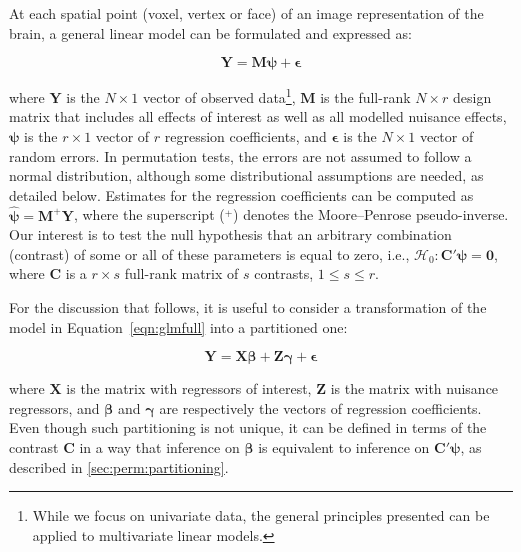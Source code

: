 At each spatial point (voxel, vertex or face) of an image representation of the brain, a general linear model \citep{Searle1971} can be formulated and expressed as:

\begin{equation}
\mathbf{Y} =  \mathbf{M} \boldsymbol{\psi} + \boldsymbol{\epsilon}
\label{eqn:glmfull}
\end{equation}

\noindent
where $\mathbf{Y}$ is the $N \times 1$ vector of observed data\footnote{While we focus on univariate data, the general principles presented can be applied to multivariate linear models.}, $\mathbf{M}$ is the full-rank $N \times r$ design matrix that includes all effects of interest as well as all modelled nuisance effects, $\boldsymbol{\psi}$ is the $r \times 1$ vector of $r$ regression coefficients, and $\boldsymbol{\epsilon}$ is the $N \times 1$ vector of random errors. In permutation tests, the errors are not assumed to follow a normal distribution, although some distributional assumptions are needed, as detailed below. Estimates for the regression coefficients can be computed as $\boldsymbol{\hat{\psi}} = \mathbf{M}^{+}\mathbf{Y}$, where the superscript ($^{+}$) denotes the Moore--Penrose pseudo-inverse. Our interest is to test the null hypothesis that an arbitrary combination (contrast) of some or all of these parameters is equal to zero, i.e., $\mathcal{H}_{0} : \mathbf{C}'\boldsymbol{\psi} =\boldsymbol{0}$, where $\mathbf{C}$ is a $r \times s$ full-rank matrix of $s$ contrasts, $1 \leqslant s \leqslant r$.

For the discussion that follows, it is useful to consider a transformation of the model in Equation~\ref{eqn:glmfull} into a partitioned one:

\begin{equation}
\mathbf{Y} = \mathbf{X}\boldsymbol{\beta} + \mathbf{Z}\boldsymbol{\gamma} + \boldsymbol{\epsilon}
\label{eqn:glmpart}
\end{equation}

\noindent
where $\mathbf{X}$ is the matrix with regressors of interest, $\mathbf{Z}$ is the matrix with nuisance regressors, and $\boldsymbol{\beta}$ and $\boldsymbol{\gamma}$ are respectively the vectors of regression coefficients. Even though such partitioning is not unique, it can be defined in terms of the contrast $\mathbf{C}$ in a way that inference on $\boldsymbol{\beta}$ is equivalent to inference on $\mathbf{C}'\boldsymbol{\psi}$, as described in \ref{sec:perm:partitioning}.

